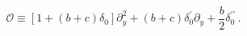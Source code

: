\begin{equation}
\mathcal{O}\equiv
[1 +(b+c)\delta_0]\partial_y^2 +(b+c)\delta^\prime_0 \partial_y
+\frac{b}{2} \delta^{\prime\prime}_0 \, . 
\end{equation}

